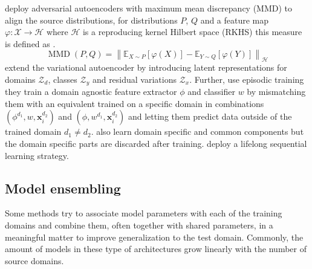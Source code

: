 \citet{LiPWK18} deploy adversarial autoencoders with maximum mean discrepancy (MMD) \citep{GrettonBRSS12} to align the source distributions, \ie for distributions $P$, $Q$ and a feature map $\varphi: \mathcal{X} \rightarrow \mathcal{H}$ where $\mathcal{H}$ is a reproducing kernel Hilbert space (RKHS) this measure is defined as .
\begin{equation}
\label{eq:mmd}
    \operatorname{MMD}(P, Q)=\left\|\mathbb{E}_{X \sim P}[\varphi(X)]-\mathbb{E}_{Y \sim Q}[\varphi(Y)]\right\|_{\mathcal{H}}
\end{equation}
\citet{ilse2019diva} extend the variational autoencoder \citep{KingmaW13} by introducing latent representations for domains $\mathcal{Z}_d$, classes $\mathcal{Z}_y$ and residual variations $\mathcal{Z}_x$. Further, \citet{LiZYLSH19} use episodic training \ie they train a domain agnostic feature extractor $\phi$ and classifier $w$ by mismatching them with an equivalent trained on a specific domain in combinations $(\phi^{d_1}, w, \mathbf{x}^{d_2}_i)$ and $(\phi, w^{d_1}, \mathbf{x}^{d_2}_i)$ and letting them predict data outside of the trained domain $d_1 \neq d_2$. \citet{piratla2020efficient} also learn domain specific and common components but the domain specific parts are discarded after training. \citet{li2020sequential} deploy a lifelong sequential learning strategy.

\subsection{Model ensembling}

Some methods try to associate model parameters with each of the training domains and combine them, often together with shared parameters, in a meaningful matter to improve generalization to the test domain. Commonly, the amount of models in these type of architectures grow linearly with the number of source domains. 

